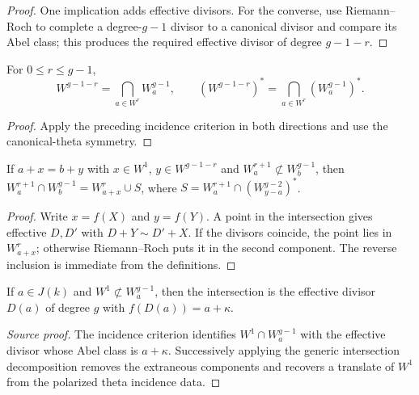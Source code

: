 \begin{proof}

One implication adds effective divisors.  For the converse, use Riemann--Roch
to complete a degree-$g-1$ divisor to a canonical divisor and compare its Abel
class; this produces the required effective divisor of degree $g-1-r$.

\end{proof}


\begin{lemma}
\label{lem:milne-torelli-intersections-source}

For $0\le r\le g-1$,
\[
W^{g-1-r}=\bigcap_{a\in W^r}W_a^{g-1},\qquad
(W^{g-1-r})^*=\bigcap_{a\in W^r}(W_a^{g-1})^*.
\]
\end{lemma}

\begin{proof}

Apply the preceding incidence criterion in both directions and use the
canonical-theta symmetry.

\end{proof}


\begin{lemma}
\label{lem:milne-torelli-generic-intersection-source}

If $a+x=b+y$ with $x\in W^1$, $y\in W^{g-1-r}$ and
$W_a^{r+1}\not\subset W_b^{g-1}$, then
$W_a^{r+1}\cap W_b^{g-1}=W_{a+x}^r\cup S$, where
$S=W_a^{r+1}\cap(W_{y-a}^{g-2})^*$.
\end{lemma}

\begin{proof}

Write $x=f(X)$ and $y=f(Y)$.  A point in the intersection gives effective
$D,D'$ with $D+Y\sim D'+X$.  If the divisors coincide, the point lies in
$W_{a+x}^r$; otherwise Riemann--Roch puts it in the second component.  The
reverse inclusion is immediate from the definitions.

\end{proof}


\begin{lemma}
\label{lem:milne-torelli-recovery-source}

If $a\in J(k)$ and $W^1\not\subset W_a^{g-1}$, then the intersection is the
effective divisor $D(a)$ of degree $g$ with $f(D(a))=a+\kappa$.
\end{lemma}
\begin{proof}[Source proof]
The incidence criterion identifies $W^1\cap W_a^{g-1}$ with the effective
divisor whose Abel class is $a+\kappa$.  Successively applying the generic
intersection decomposition removes the extraneous components and recovers a
translate of $W^1$ from the polarized theta incidence data.
\end{proof}
